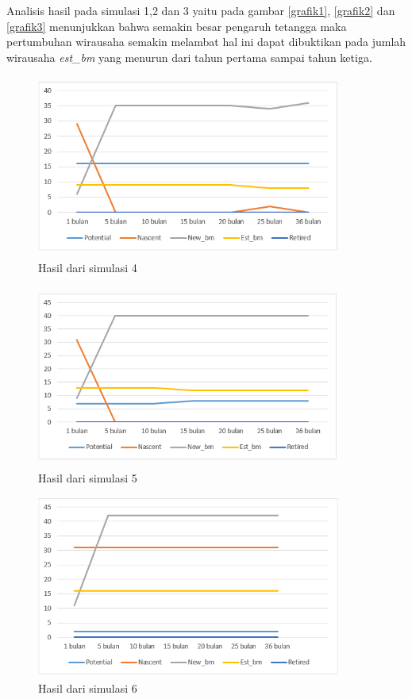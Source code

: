 Analisis hasil pada simulasi 1,2 dan 3 yaitu pada gambar \ref{grafik1}, \ref{grafik2} dan \ref{grafik3} menunjukkan bahwa semakin besar pengaruh tetangga maka pertumbuhan wirausaha semakin melambat hal ini dapat dibuktikan pada jumlah wirausaha \textit{est\_bm} yang menurun dari tahun pertama sampai tahun ketiga.

	\begin{figure} [H]
	\centering  
	\includegraphics[width=10cm, height=6cm]{grafik4} 
		\caption[Hasil dari simulasi 4]{Hasil dari simulasi 4}
	\label{grafik4} 
\end{figure}

	\begin{figure} [H]
	\centering  
	\includegraphics[width=10cm, height=6cm]{grafik5} 
		\caption[Hasil dari simulasi 5]{Hasil dari simulasi 5}
	\label{grafik5} 
\end{figure}

	\begin{figure} [H]
	\centering  
	\includegraphics[width=10cm, height=6cm]{grafik6} 
		\caption[Hasil dari simulasi 6]{Hasil dari simulasi 6}
	\label{grafik6} 
\end{figure}

